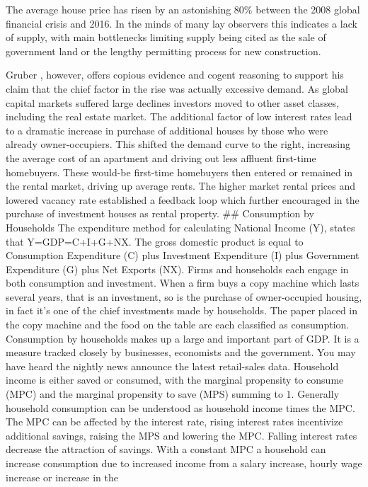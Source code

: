 \documentclass[12pt,a4paper,]{article}
\begin{document}
The average house price has risen by an astonishing 80\% between the
2008 global financial crisis and 2016. In the minds of many lay
observers this indicates a lack of supply, with main bottlenecks
limiting supply being cited as the sale of government land or the
lengthy permitting process for new construction.

Gruber \autocite{gruberSep2016}, however, offers copious evidence and
cogent reasoning to support his claim that the chief factor in the rise
was actually excessive demand. As global capital markets suffered large
declines investors moved to other asset classes, including the real
estate market. The additional factor of low interest rates lead to a
dramatic increase in purchase of additional houses by those who were
already owner-occupiers. This shifted the demand curve to the right,
increasing the average cost of an apartment and driving out less
affluent first-time homebuyers. These would-be first-time homebuyers
then entered or remained in the rental market, driving up average rents.
The higher market rental prices and lowered vacancy rate established a
feedback loop which further encouraged in the purchase of investment
houses as rental property. \#\# Consumption by Households The
expenditure method for calculating National Income (Y), states that
Y=GDP=C+I+G+NX. The gross domestic product is equal to Consumption
Expenditure (C) plus Investment Expenditure (I) plus Government
Expenditure (G) plus Net Exports (NX). Firms and households each engage
in both consumption and investment. When a firm buys a copy machine
which lasts several years, that is an investment, so is the purchase of
owner-occupied housing, in fact it's one of the chief investments made
by households. The paper placed in the copy machine and the food on the
table are each classified as consumption. Consumption by households
makes up a large and important part of GDP. It is a measure tracked
closely by businesses, economists and the government. You may have heard
the nightly news announce the latest retail-sales data. Household income
is either saved or consumed, with the marginal propensity to consume
(MPC) and the marginal propensity to save (MPS) summing to 1. Generally
household consumption can be understood as household income times the
MPC. The MPC can be affected by the interest rate, rising interest rates
incentivize additional savings, raising the MPS and lowering the MPC.
Falling interest rates decrease the attraction of savings. With a
constant MPC a household can increase consumption due to increased
income from a salary increase, hourly wage increase or increase in the
\end{document}
